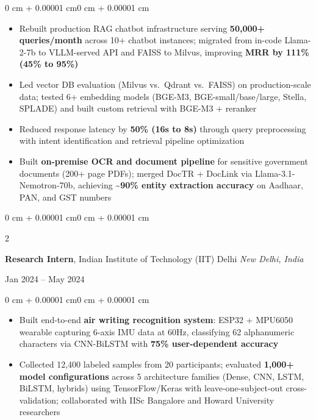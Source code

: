 \documentclass[10pt, letterpaper]{article}
\newenvironment{highlights}{
    \begin{itemize}[
        topsep=0.01 cm,
        parsep=0.01 cm,
        partopsep=0pt,
        itemsep=0pt,
        leftmargin=0 cm + 10pt
    ]
}{
    \end{itemize}
}
\newenvironment{onecolentry}{
    \begin{adjustwidth}{0 cm + 0.00001 cm}{0 cm + 0.00001 cm}
}{
    \end{adjustwidth}
}
\newenvironment{twocolentry}[2][]{
    \onecolentry
    \def\secondColumn{#2}
    \setcolumnwidth{\fill, 5.5 cm}
    \begin{paracol}{2}
}{
    \switchcolumn \raggedleft \secondColumn
    \end{paracol}
    \endonecolentry
}
\begin{document}
        \vspace{0.02 cm}
        \begin{onecolentry}
            \begin{highlights}
                \item Rebuilt production RAG chatbot infrastructure serving \textbf{50,000+ queries/month} across 10+ chatbot instances; migrated from in-code Llama-2-7b to VLLM-served API and FAISS to Milvus, improving \textbf{MRR by 111\% (45\% to 95\%)}
                \item Led vector DB evaluation (Milvus vs.\ Qdrant vs.\ FAISS) on production-scale data; tested 6+ embedding models (BGE-M3, BGE-small/base/large, Stella, SPLADE) and built custom retrieval with BGE-M3 + reranker
                \item Reduced response latency by \textbf{50\% (16s to 8s)} through query preprocessing with intent identification and retrieval pipeline optimization
                \item Built \textbf{on-premise OCR and document pipeline} for sensitive government documents (200+ page PDFs); merged DocTR + DocLink via Llama-3.1-Nemotron-70b, achieving \textasciitilde\textbf{90\% entity extraction accuracy} on Aadhaar, PAN, and GST numbers
            \end{highlights}
        \end{onecolentry}

        \vspace{0.05 cm}

        \begin{twocolentry}{
            Jan 2024 -- May 2024
        }
            \textbf{Research Intern}, Indian Institute of Technology (IIT) Delhi \hfill \textit{New Delhi, India}
        \end{twocolentry}

        \vspace{0.02 cm}
        \begin{onecolentry}
            \begin{highlights}
                \item Built end-to-end \textbf{air writing recognition system}: ESP32 + MPU6050 wearable capturing 6-axis IMU data at 60Hz, classifying 62 alphanumeric characters via CNN-BiLSTM with \textbf{75\% user-dependent accuracy}
                \item Collected 12,400 labeled samples from 20 participants; evaluated \textbf{1,000+ model configurations} across 5 architecture families (Dense, CNN, LSTM, BiLSTM, hybrids) using TensorFlow/Keras with leave-one-subject-out cross-validation; collaborated with IISc Bangalore and Howard University researchers
            \end{highlights}
        \end{onecolentry}
\end{document}
